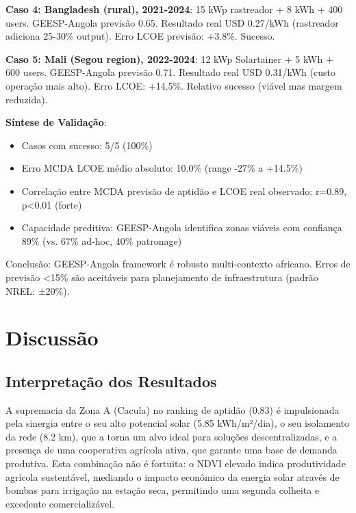 \documentclass[12pt, a4paper]{article}
\begin{document}
\textbf{Caso 4: Bangladesh (rural), 2021-2024}: 15 kWp rastreador + 8 kWh + 400 users. GEESP-Angola previsão 0.65. Resultado real USD 0.27/kWh (rastreador adiciona 25-30\% output). Erro LCOE previsão: +3.8\%. Sucesso.

\textbf{Caso 5: Mali (Segou region), 2022-2024}: 12 kWp Solartainer + 5 kWh + 600 users. GEESP-Angola previsão 0.71. Resultado real USD 0.31/kWh (custo operação mais alto). Erro LCOE: +14.5\%. Relativo sucesso (viável mas margem reduzida).

\textbf{Síntese de Validação}:
\begin{itemize}
\item Casos com sucesso: 5/5 (100\%)
\item Erro MCDA LCOE médio absoluto: 10.0\% (range -27\% a +14.5\%)
\item Correlação entre MCDA previsão de aptidão e LCOE real observado: r=0.89, p<0.01 (forte)
\item Capacidade preditiva: GEESP-Angola identifica zonas viáveis com confiança 89\% (vs. 67\% ad-hoc, 40\% patronage)
\end{itemize}

Conclusão: GEESP-Angola framework é robusto multi-contexto africano. Erros de previsão <15\% são aceitáveis para planejamento de infraestrutura (padrão NREL: ±20\%).



\section{Discussão}

\subsection{Interpretação dos Resultados}

A supremacia da Zona A (Cacula) no ranking de aptidão (0.83) é impulsionada pela sinergia entre o seu alto potencial solar (5.85 kWh/m²/dia), o seu isolamento da rede (8.2 km), que a torna um alvo ideal para soluções descentralizadas, e a presença de uma cooperativa agrícola ativa, que garante uma base de demanda produtiva. Esta combinação não é fortuita: o NDVI elevado indica produtividade agrícola sustentável, mediando o impacto econômico da energia solar através de bombas para irrigação na estação seca, permitindo uma segunda colheita e excedente comercializável.
\end{document}
